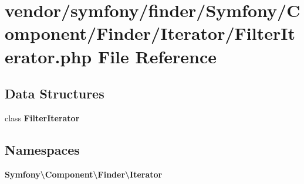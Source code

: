 \section{vendor/symfony/finder/\+Symfony/\+Component/\+Finder/\+Iterator/\+Filter\+Iterator.php File Reference}
\label{_filter_iterator_8php}
\subsection*{Data Structures}
\begin{DoxyCompactItemize}
\item 
class {\bf Filter\+Iterator}
\end{DoxyCompactItemize}
\subsection*{Namespaces}
\begin{DoxyCompactItemize}
\item 
 {\bf Symfony\textbackslash{}\+Component\textbackslash{}\+Finder\textbackslash{}\+Iterator}
\end{DoxyCompactItemize}
